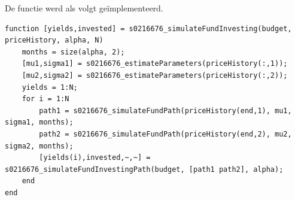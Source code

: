 \vspace*{\fill}

\restoregeometry



De functie werd als volgt ge\"implementeerd.

\begin{lstlisting}
function [yields,invested] = s0216676_simulateFundInvesting(budget, priceHistory, alpha, N)
    months = size(alpha, 2);
    [mu1,sigma1] = s0216676_estimateParameters(priceHistory(:,1));
    [mu2,sigma2] = s0216676_estimateParameters(priceHistory(:,2));
    yields = 1:N;
    for i = 1:N
        path1 = s0216676_simulateFundPath(priceHistory(end,1), mu1, sigma1, months);
        path2 = s0216676_simulateFundPath(priceHistory(end,2), mu2, sigma2, months);
        [yields(i),invested,~,~] = s0216676_simulateFundInvestingPath(budget, [path1 path2], alpha);
    end
end
\end{lstlisting}








